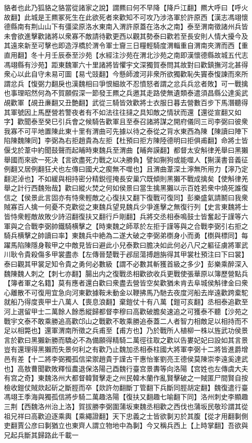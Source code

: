 貉者也此乃狐貉之貉當從諸家之說】謂羆曰何不早降【降戶江翻】羆大呼曰【呼火故翻】此城是王羆冢死生在此欲死者來歡知不可攻乃涉洛軍於許原西【漢志馮翊懷德縣南有荆山山下有彊梁原洛水東南入渭許原蓋在洛水之南】泰至渭南徵諸州兵皆未會欲進擊歡諸將以衆寡不敵請待歡更西以觀其勢泰曰歡若至長安則人情大擾今及其遠來新至可擊也即造浮橋於渭令軍士齎三日糧輕騎度渭輜重自渭南夾渭而西【重直用翻】冬十月壬辰泰至沙苑【水經注沙苑在渭北沙苑之南即漢懷德縣故城五代志馮翊縣有沙苑】距東魏軍六十里諸將皆懼宇文深獨賀泰問其故對曰歡鎮撫河北甚得衆心以此自守未易可圖【易弋豉翻】今懸師渡河非衆所欲獨歡恥失竇泰愎諫而來所謂忿兵【愎弼力翻戾也漢魏相曰爭恨細故不忍憤怒者謂之忿兵兵忿者敗】可一戰擒也事理昭然何為不賀願假深一節發王羆之兵邀其走路使無遺類泰遣須昌縣公達奚武覘歡軍【覘丑亷翻又丑艶翻】武從三騎皆效歡將士衣服日暮去營數百步下馬潛聽得其軍號因上馬歷營若警夜者有不如法往往撻之具知敵之情狀而還【還從宣翻又如字】歡聞泰至癸巳引兵會之候騎告歡軍且至泰召諸將謀之開府儀同三司李弼曰彼衆我寡不可平地置陳此東十里有渭曲可先據以待之泰從之背水東西為陳【陳讀曰陣下陷陳魏陳同】李弼為右拒趙貴為左拒【杜預曰拒方陳陸德明曰拒俱甫翻】命將士皆偃戈於葦中約聞鼓聲而起晡時東魏兵至渭曲【晡奔謨翻】都督太安斛律羌舉曰黑獺舉國而來欲一死决【言欲盡死力戰之以决勝負】譬如猘狗或能噬人【猘漢書音義征例翻又居例翻狂犬也左傳曰國犬之瘈無不噬也】且渭曲葦深土濘無所用力【濘乃定翻泥淖也】不如緩與相持密分精鋭徑掩長安巢穴既傾則黑獺不戰成擒矣【使斛律羌舉之計行西魏殆哉】歡曰縱火焚之何如侯景曰當生擒黑獺以示百姓若衆中燒死誰復信之【侯景此言固亦有恃衆輕敵之心復扶又翻下復戰可復同】彭樂盛氣請鬭曰我衆賊寡百人擒一何憂不克歡從之東魏兵望見魏兵少爭進擊之無復行列【史言東魏將士皆恃衆輕敵故敗少詩沼翻復扶又翻行戶剛翻】兵將交丞相泰鳴鼓士皆奮起于謹等六軍與之合戰李弼帥鐵騎横擊之【時東魏之師萃於左拒于謹等與之合戰李弼引右拒之騎兵横擊之帥讀曰率】東魏兵中絶為二遂大破之李弼弟檦身小而勇【檦與標同】每躍馬陷陳隱身鞍甲之中敵見皆曰避此小兒泰歎曰膽决如此何必八尺之軀征虜將軍武川耿令貴殺傷多甲裳盡赤【左傳晉楚戰于邲屈蕩搏趙旃得其甲裳杜預注曰下曰裳】泰曰觀其甲裳足知令貴之勇何必數級【謂不必數其斬獲首級之多少】彭樂乘醉深入魏陳魏人刺之【刺七亦翻】腸出内之復戰丞相歡欲收兵更戰使張華原以簿歷營點兵【簿者軍之名籍】莫有應者還白歡曰衆盡去營皆空矣歡猶未肯去阜城侯斛律金曰衆心離散不可復用宜急向河東歡據鞍未動金以鞭拂馬乃馳去夜度河船去岸遠歡跨槖駝就船乃得度喪甲士八萬人【喪息浪翻】棄鎧仗十有八萬【鎧可亥翻】丞相泰追歡至河上選留甲士二萬餘人餘悉縱歸都督李穆曰高歡破膽矣速追之可獲泰不聽【沙苑之戰宇文泰不敢乘勝追高歡邙山之戰歡不敢乘勝追泰蓋二人者智力相敵足以相持而不足以相斃也】還軍渭南所徵之兵甫至【甫方也】乃於戰所人植柳一株以旌武功侯景言於歡曰黑獺新勝而驕必不為備願得精騎二萬徑往取之歡以告婁妃妃曰設如其言景豈有還理得黑獺而失景何利之有歡乃止魏加丞相泰柱國大將軍李弼十二將皆進爵增邑有差【十二將李弼獨孤信梁禦趙貴于謹古干惠怡峯劉亮王德侯莫陳崇李遠奚達武也】高敖曹聞歡敗釋恒農退保洛陽己酉魏行臺宫景夀等向洛陽【宫姓也左傳虞大夫有宫之奇】東魏洛州大都督韓賢擊走之州民韓木蘭作亂賢擊破之一賊匿尸間賢自按檢收鎧仗賊欻起斫之斷脛而卒【欻許勿翻斷丁管翻下兵斷同脛胡定翻】魏復遣行臺馮翊王季海與獨孤信將步騎二萬趣洛陽【復扶又翻趣七喻翻下同】洛州刺史李顯趣三荆【西魏洛州治上洛】賀拔勝李弼圍蒲坂東魏丞相歡之西伐也蒲坂民敬珍謂其從祖兄祥曰高歡迫逐乘輿【乘繩證翻】天下忠義之士皆欲剚刃於其腹【從才用翻剚側吏翻賈公彦曰剚猶立也東齊人謂立物地中為剚】今又稱兵西上【上時掌翻】吾欲與兄起兵斷其歸路此千載一